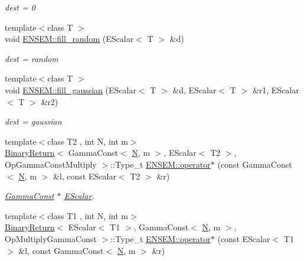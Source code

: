 \begin{DoxyCompactItemize}
\begin{DoxyCompactList}\small\item\em dest = 0 \end{DoxyCompactList}\item 
{\footnotesize template$<$class T $>$ }\\void \mbox{\hyperlink{group__escalar_gab876765eed1c2ac8b1d1adcf0b0ba123}{E\+N\+S\+E\+M\+::fill\+\_\+random}} (E\+Scalar$<$ T $>$ \&d)
\begin{DoxyCompactList}\small\item\em dest = random \end{DoxyCompactList}\item 
{\footnotesize template$<$class T $>$ }\\void \mbox{\hyperlink{group__escalar_ga3598759ad3e33b4008dd80a044cc75a8}{E\+N\+S\+E\+M\+::fill\+\_\+gaussian}} (E\+Scalar$<$ T $>$ \&d, E\+Scalar$<$ T $>$ \&r1, E\+Scalar$<$ T $>$ \&r2)
\begin{DoxyCompactList}\small\item\em dest = gaussian \end{DoxyCompactList}\item 
{\footnotesize template$<$class T2 , int N, int m$>$ }\\\mbox{\hyperlink{structBinaryReturn}{Binary\+Return}}$<$ Gamma\+Const$<$ \mbox{\hyperlink{adat__devel_2lib_2hadron_2operator__name__util_8cc_a7722c8ecbb62d99aee7ce68b1752f337}{N}}, m $>$, E\+Scalar$<$ T2 $>$, Op\+Gamma\+Const\+Multiply $>$\+::Type\+\_\+t \mbox{\hyperlink{group__escalar_gae8dabaf2e8ff409632f9943294b5a6b4}{E\+N\+S\+E\+M\+::operator$\ast$}} (const Gamma\+Const$<$ \mbox{\hyperlink{adat__devel_2lib_2hadron_2operator__name__util_8cc_a7722c8ecbb62d99aee7ce68b1752f337}{N}}, m $>$ \&l, const E\+Scalar$<$ T2 $>$ \&r)
\begin{DoxyCompactList}\small\item\em \mbox{\hyperlink{classENSEM_1_1GammaConst}{Gamma\+Const}} $\ast$ \mbox{\hyperlink{classENSEM_1_1EScalar}{E\+Scalar}}. \end{DoxyCompactList}\item 
{\footnotesize template$<$class T1 , int N, int m$>$ }\\\mbox{\hyperlink{structBinaryReturn}{Binary\+Return}}$<$ E\+Scalar$<$ T1 $>$, Gamma\+Const$<$ \mbox{\hyperlink{adat__devel_2lib_2hadron_2operator__name__util_8cc_a7722c8ecbb62d99aee7ce68b1752f337}{N}}, m $>$, Op\+Multiply\+Gamma\+Const $>$\+::Type\+\_\+t \mbox{\hyperlink{group__escalar_ga10de70ea3b5491035fab4f67de013321}{E\+N\+S\+E\+M\+::operator$\ast$}} (const E\+Scalar$<$ T1 $>$ \&l, const Gamma\+Const$<$ \mbox{\hyperlink{adat__devel_2lib_2hadron_2operator__name__util_8cc_a7722c8ecbb62d99aee7ce68b1752f337}{N}}, m $>$ \&r)

\end{DoxyCompactItemize}
